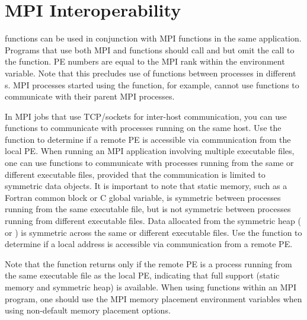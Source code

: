 \section{\ac{MPI} Interoperability}

\openshmem functions can be used in conjunction  with  \ac{MPI}
functions  in  the  same  application.   Programs that use both \ac{MPI} and
\openshmem functions should call  and  but omit the call
to  the  function.  \openshmem \ac{PE} numbers are equal to the \ac{MPI} rank
within the  environment variable.  Note  that  this  precludes 
use of \openshmem functions between processes in different s. 
\ac{MPI} processes started using the   function,  for
example,  cannot  use  \openshmem functions to communicate with their parent
\ac{MPI} processes.

 In \ac{MPI} jobs that use TCP/sockets for inter-host communication,  you  can
 use \openshmem functions to communicate with processes running on the same
 host.  Use the  function to determine if a remote \ac{PE}
 is accessible via \openshmem communication from the local \ac{PE}. When  running  an  \ac{MPI} application involving multiple executable files,
 one can use \openshmem functions to communicate with processes running  from
 the same or different executable files, provided that the communication
 is limited to symmetric data objects.  It is  important  to  note  that
 static  memory, such as a Fortran common block or C global variable, is
 symmetric between processes running from the same executable file,  but
 is  not  symmetric  between processes running from different executable
 files.  Data allocated from the symmetric heap (  or  )
 is  symmetric  across  the same or different executable files. Use the
  function to  determine  if  a  local  address  is
 accessible via \openshmem communication from a remote \ac{PE}.

 Note  that  the   function returns  only if the
 remote \ac{PE} is a process running from the same  executable  file  as  the
 local PE, indicating that full \openshmem support (static memory and symmetric heap) 
 is available. When using \openshmem functions within an \ac{MPI} program, one  should  use  the
 \ac{MPI}  memory placement environment variables when using non-default memory 
 placement options.
